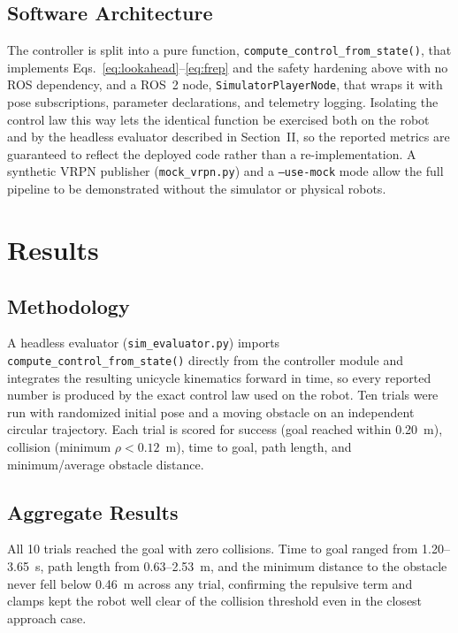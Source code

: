 \documentclass[conference]{IEEEtran}
\begin{document}
\subsection{Software Architecture}
The controller is split into a pure function, \texttt{compute\_control\_from\_state()}, that implements Eqs.~\eqref{eq:lookahead}--\eqref{eq:frep} and the safety hardening above with no ROS dependency, and a ROS~2 node, \texttt{SimulatorPlayerNode}, that wraps it with pose subscriptions, parameter declarations, and telemetry logging. Isolating the control law this way lets the identical function be exercised both on the robot and by the headless evaluator described in Section~II, so the reported metrics are guaranteed to reflect the deployed code rather than a re-implementation. A synthetic VRPN publisher (\texttt{mock\_vrpn.py}) and a \texttt{--use-mock} mode allow the full pipeline to be demonstrated without the simulator or physical robots.

\section{Results}

\subsection{Methodology}
A headless evaluator (\texttt{sim\_evaluator.py}) imports \texttt{compute\_control\_from\_state()} directly from the controller module and integrates the resulting unicycle kinematics forward in time, so every reported number is produced by the exact control law used on the robot. Ten trials were run with randomized initial pose and a moving obstacle on an independent circular trajectory. Each trial is scored for success (goal reached within 0.20~m), collision (minimum $\rho<0.12$~m), time to goal, path length, and minimum/average obstacle distance.

\subsection{Aggregate Results}
All 10 trials reached the goal with zero collisions. Time to goal ranged from 1.20--3.65~s, path length from 0.63--2.53~m, and the minimum distance to the obstacle never fell below 0.46~m across any trial, confirming the repulsive term and clamps kept the robot well clear of the collision threshold even in the closest approach case.
\end{document}
